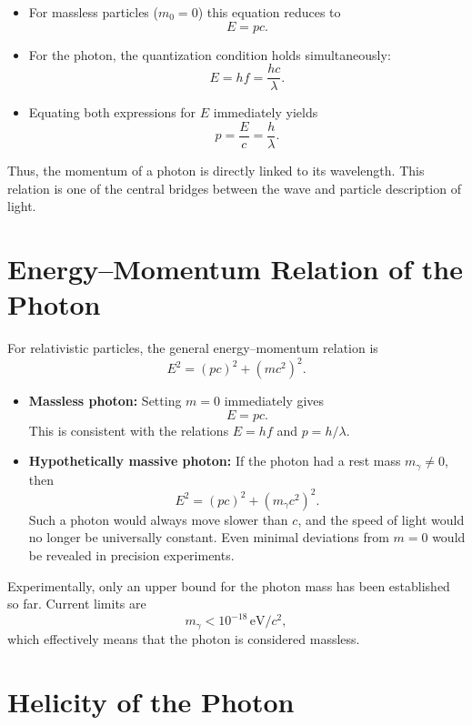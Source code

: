 \begin{itemize}
	\item For massless particles ($m_0 = 0$) this equation reduces to
	\[
	E = p c.
	\]
	
	\item For the photon, the quantization condition holds simultaneously:
	\[
	E = h f = \frac{h c}{\lambda}.
	\]
	
	\item Equating both expressions for $E$ immediately yields
	\[
	p = \frac{E}{c} = \frac{h}{\lambda}.
	\]
\end{itemize}

\noindent
Thus, the momentum of a photon is directly linked to its wavelength. This relation is one of the central bridges between the wave and particle description of light.

\section{Energy–Momentum Relation of the Photon}
\label{anhangA:masse}

For relativistic particles, the general energy–momentum relation is
\[
E^2 = (pc)^2 + (m c^2)^2.
\]

\begin{itemize}
	\item \textbf{Massless photon:}  
	Setting $m=0$ immediately gives
	\[
	E = p c.
	\]
	This is consistent with the relations $E = h f$ and $p = h/\lambda$.
	
	\item \textbf{Hypothetically massive photon:}  
	If the photon had a rest mass $m_\gamma \neq 0$, then
	\[
	E^2 = (p c)^2 + (m_\gamma c^2)^2.
	\]
	Such a photon would always move slower than $c$, and the speed of light would no longer be universally constant.  
	Even minimal deviations from $m=0$ would be revealed in precision experiments.
\end{itemize}

Experimentally, only an upper bound for the photon mass has been established so far. Current limits are
\[
m_\gamma < 10^{-18}\,\text{eV}/c^2,
\]
which effectively means that the photon is considered massless.

\section{Helicity of the Photon}
\label{anhangA:helizitaet}

